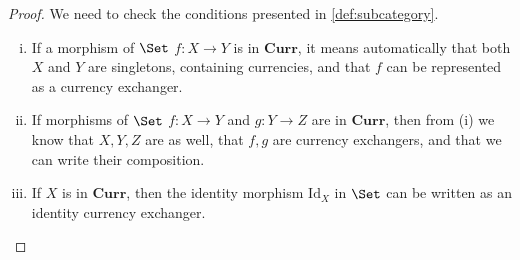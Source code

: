 \begin{proof}
    We need to check the conditions presented in \cref{def:subcategory}.
    \begin{enumerate}[(i)]
        \item If a morphism of $\Set$ $f\colon X\to Y$ is in $\mathbf{Curr}$, it means automatically that both $X$ and $Y$ are singletons, containing currencies, and that $f$ can be represented as a currency exchanger.
        \item If morphisms of $\Set$ $f\colon X\to Y$ and $g\colon Y \to Z$ are in $\mathbf{Curr}$, then from (i) we know that $X,Y,Z$ are as well, that $f,g$ are currency exchangers, and that we can write their composition.
        \item If $X$ is in $\mathbf{Curr}$, then the identity morphism $\text{Id}_X$ in $\Set$ can be written as an identity currency exchanger.
    \end{enumerate}
\end{proof}